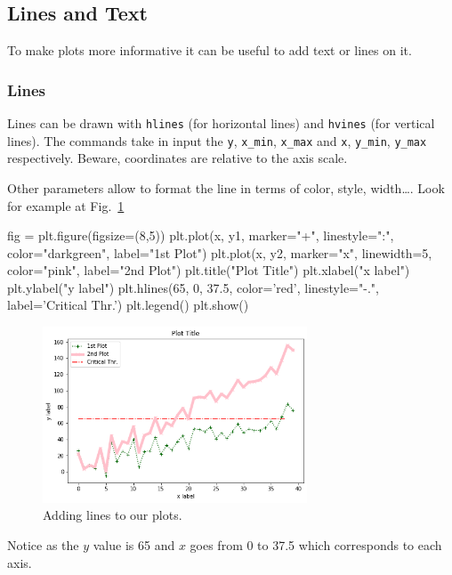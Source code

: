 \subsection{Lines and Text}\label{lines-and-text}

To make plots more informative it can be useful to add text or lines on it.

\subsubsection{Lines}\label{lines}

Lines can be drawn with \texttt{hlines} (for horizontal lines) and
\texttt{hvines} (for vertical lines). The commands take in input the \texttt{y}, \texttt{x\_min}, \texttt{x\_max} and \texttt{x}, \texttt{y\_min}, \texttt{y\_max} respectively. Beware, coordinates are relative to the axis scale.

Other parameters allow to format the line in terms of color, style, width\ldots. Look for example at Fig.~\ref{fig:lines}

\begin{ipython}
fig = plt.figure(figsize=(8,5))
plt.plot(x, y1, marker="+", linestyle=":", color="darkgreen", label="1st Plot")
plt.plot(x, y2, marker="x", linewidth=5, color="pink", label="2nd Plot")
plt.title("Plot Title")
plt.xlabel("x label")
plt.ylabel("y label")
plt.hlines(65, 0, 37.5, color='red', linestyle="-.", label='Critical Thr.')
plt.legend()
plt.show()
\end{ipython}

\begin{figure}[htb]
	\centering
	\includegraphics[width=0.7\textwidth]{figures/lines}
	\caption{Adding lines to our plots.}
	\label{fig:lines}
\end{figure}

Notice as the $y$ value is 65 and $x$ goes from 0 to 37.5 which corresponds to each axis.

